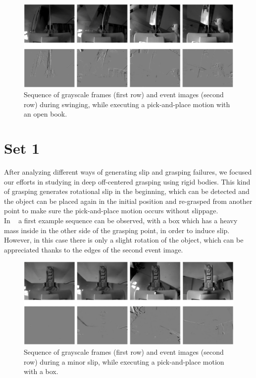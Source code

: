 \begin{figure}[H]
    \centering
    \includegraphics[width=\textwidth]{resources/images/init_exp4}
    \caption{Sequence of grayscale frames (first row) and event images (second row) during swinging, while executing a pick-and-place motion with an open book.}\label{fig:init_exp4}
\end{figure}

\section{Set 1}

After analyzing different ways of generating slip and grasping failures, we focused our efforts in studying in deep off-centered grasping using rigid bodies. This kind of grasping generates rotational slip in the beginning, which can be detected and the object can be placed again in the initial position and re-grasped from another point to make sure the pick-and-place motion occurs without slippage.\\

In ~ a first example sequence can be observed, with a box which has a heavy mass inside in the other side of the grasping point, in order to induce slip. However, in this case there is only a slight rotation of the object, which can be appreciated thanks to the edges of the second event image.

\begin{figure}[H]
    \centering
    \includegraphics[width=\textwidth]{resources/images/set1_case1}
    \caption{Sequence of grayscale frames (first row) and event images (second row) during a minor slip, while executing a pick-and-place motion with a box.}\label{fig:set1_case1}
\end{figure}

